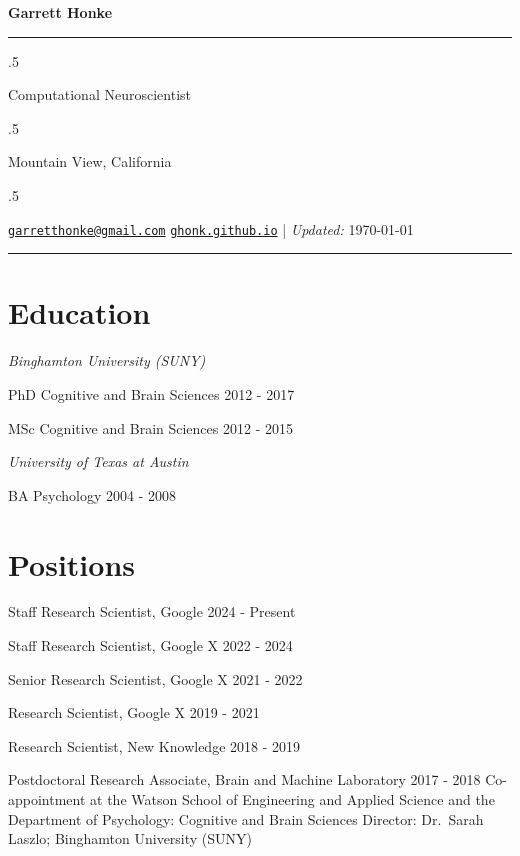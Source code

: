 \documentclass[11pt,]{article}
\begin{document}
\centerline{\huge \bf Garrett Honke}

\vspace{2 mm}

\hrule

\vspace{2 mm}

\moveleft.5\hoffset\centerline{Computational Neuroscientist}
\moveleft.5\hoffset\centerline{Mountain View, California}
\moveleft.5\hoffset\centerline{ \faEnvelopeO \hspace{1 mm} \href{mailto:}{\tt \href{mailto:garretthonke@gmail.com}{\nolinkurl{garretthonke@gmail.com}}} \hspace{1 mm}     \faGlobe \hspace{1 mm} \href{http://ghonk.github.io}{\tt ghonk.github.io}    | \emph{Updated:} \today}

\vspace{2 mm}

\hrule


\section{Education}\label{education}

\emph{Binghamton University (SUNY)}

PhD Cognitive and Brain Sciences \hfill 2012 - 2017

MSc Cognitive and Brain Sciences \hfill 2012 - 2015

\bigskip

\emph{University of Texas at Austin}

BA Psychology \hfill 2004 - 2008

\section{Positions}\label{positions}

Staff Research Scientist, Google \hfill 2024 - Present

Staff Research Scientist, Google X \hfill 2022 - 2024

Senior Research Scientist, Google X \hfill 2021 - 2022

Research Scientist, Google X \hfill 2019 - 2021

Research Scientist, New Knowledge \hfill 2018 - 2019

Postdoctoral Research Associate, Brain and Machine Laboratory
\hfill 2017 - 2018 \linebreak Co-appointment at the Watson School of
Engineering and Applied Science and \newline the Department of
Psychology: Cognitive and Brain Sciences \newline  Director: Dr.~Sarah
Laszlo; Binghamton University (SUNY)
\end{document}
